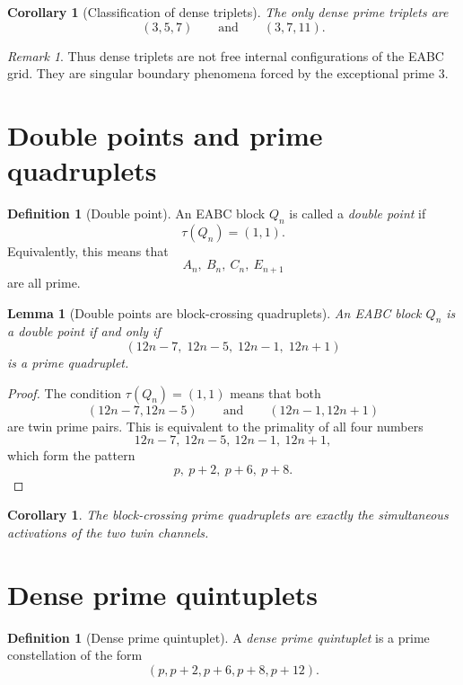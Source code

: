 \documentclass[11pt,a4paper]{article}
\newtheorem{lemma}[theorem]{Lemma}
\newtheorem{corollary}[theorem]{Corollary}
\theoremstyle{definition}
\newtheorem{definition}[theorem]{Definition}
\theoremstyle{remark}
\newtheorem{remark}[theorem]{Remark}
\begin{document}
	\begin{corollary}[Classification of dense triplets]
		The only dense prime triplets are
		\[
		(3,5,7)
		\qquad\text{and}\qquad
		(3,7,11).
		\]
	\end{corollary}
	
	\begin{remark}
		Thus dense triplets are not free internal configurations of the EABC grid. They are singular boundary
		phenomena forced by the exceptional prime \(3\).
	\end{remark}
	
	\section{Double points and prime quadruplets}
	
	\begin{definition}[Double point]
		An EABC block \(Q_n\) is called a \emph{double point} if
		\[
		\tau(Q_n)=(1,1).
		\]
		Equivalently, this means that
		\[
		A_n,\ B_n,\ C_n,\ E_{n+1}
		\]
		are all prime.
	\end{definition}
	
	\begin{lemma}[Double points are block-crossing quadruplets]
		An EABC block \(Q_n\) is a double point if and only if
		\[
		(12n-7,\;12n-5,\;12n-1,\;12n+1)
		\]
		is a prime quadruplet.
	\end{lemma}
	
	\begin{proof}
		The condition \(\tau(Q_n)=(1,1)\) means that both
		\[
		(12n-7,12n-5)
		\qquad\text{and}\qquad
		(12n-1,12n+1)
		\]
		are twin prime pairs. This is equivalent to the primality of all four numbers
		\[
		12n-7,\ 12n-5,\ 12n-1,\ 12n+1,
		\]
		which form the pattern
		\[
		p,\ p+2,\ p+6,\ p+8.
		\]
	\end{proof}
	
	\begin{corollary}
		The block-crossing prime quadruplets are exactly the simultaneous activations of the two twin channels.
	\end{corollary}
	
	\section{Dense prime quintuplets}
	
	\begin{definition}[Dense prime quintuplet]
		A \emph{dense prime quintuplet} is a prime constellation of the form
		\[
		(p,p+2,p+6,p+8,p+12).
		\]
	\end{definition}
	
\end{document}
